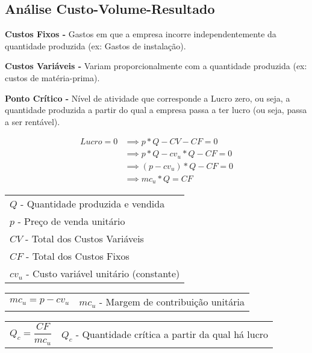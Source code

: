 \documentclass[11pt]{article}
\begin{document}
\subsection{Análise Custo-Volume-Resultado}

\textbf{Custos Fixos -} Gastos em que a empresa incorre independentemente da quantidade produzida (ex: Gastos de instalação).

\textbf{Custos Variáveis -} Variam proporcionalmente com a quantidade produzida (ex: custos de matéria-prima).

\textbf{Ponto Crítico -} Nível de atividade que corresponde a Lucro zero, ou seja, a quantidade produzida a partir do qual a empresa passa a ter lucro (ou seja, passa a ser rentável).

\begin{align*}
    Lucro = 0 & \implies p * Q - CV - CF = 0 \\
    & \implies p * Q - cv_u * Q - CF = 0 \\
    & \implies (p - cv_u) * Q - CF = 0 \\
    & \implies mc_u * Q = CF
\end{align*}
\begin{center}
    \begin{tabular}{l}
        $Q$ - Quantidade produzida e vendida \\
        $p$ - Preço de venda unitário \\
        $CV$ - Total dos Custos Variáveis \\
        $CF$ - Total dos Custos Fixos \\
        $cv_u$ - Custo variável unitário (constante) \\
    \end{tabular}
\end{center}

\begin{tabular}{ c c }
    \begin{minipage}{0.45\textwidth}
        \begin{equation*}
            mc_u = p - cv_u
        \end{equation*}
    \end{minipage} &
    \begin{minipage}{0.45\textwidth}
        $mc_u$ - Margem de contribuição unitária 
    \end{minipage}
\end{tabular}

\begin{tabular}{ c c }
    \begin{minipage}{0.45\textwidth}
        \begin{equation*}
            Q_c = \frac{CF}{mc_u}
        \end{equation*}
    \end{minipage} &
    \begin{minipage}{0.45\textwidth}
        $Q_c$ - Quantidade crítica a partir da qual há lucro
    \end{minipage}
\end{tabular}
\end{document}
